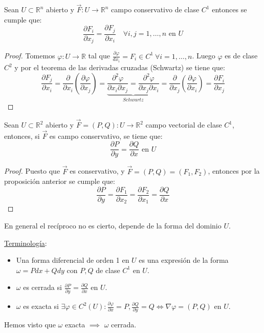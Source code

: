 \begin{proposición}
Sean $U \subset \mathbb{R}^n$ abierto y $\vec{F}: U \to \mathbb{R}^n$ campo conservativo de clase $C^1$ entonces se cumple que: 
$$\frac{\partial F_i}{\partial x_j} = \frac{\partial F_j}{\partial x_i} \quad \forall i,j = 1, \ldots, n \text{ en } U$$
\end{proposición}
\begin{proof}
    Tomemos $\varphi: U \to \mathbb{R}$ tal que $\frac{\partial\varphi}{dx_i} = F_i \in C^1 \ \forall i = 1, \ldots, n$. Luego $\varphi$ es de clase $C^2$ y por el teorema de las derivadas cruzadas (Schwartz) se tiene que:
    $$\frac{\partial F_j}{\partial x_i} = \frac{\partial}{\partial x_i}\left(\frac{\partial \varphi}{\partial x_j}\right) = \underbrace{\frac{\partial^2 \varphi}{\partial x_i \partial x_j} = \frac{\partial^2 \varphi}{\partial x_j \partial x_i}}_{Schwartz} = \frac{\partial}{\partial x_j}\left(\frac{\partial \varphi}{\partial x_i}\right) = \frac{\partial F_i}{\partial x_j}$$
\end{proof}
\begin{corolario}
    Sean $U \subset \mathbb{R}^2$ abierto y $\vec{F} = (P, Q): U \to \mathbb{R}^2$ campo vectorial de clase $C^1$, entonces, si $\vec{F}$ es campo conservativo, se tiene que:
    $$\frac{\partial P}{\partial y} = \frac{\partial Q}{\partial x} \text{ en } U$$
\end{corolario}
\begin{proof}
    Puesto que $\vec{F}$ es conservativo, y $\vec{F} = (P, Q) = (F_1, F_2)$, entonces por la proposición anterior se cumple que:
    $$\frac{\partial P}{\partial y} = \frac{\partial F_1}{\partial x_2} = \frac{\partial F_2}{\partial x_1} = \frac{\partial Q}{\partial x}$$ 
\end{proof}
\begin{observación}
En general el recíproco no es cierto, depende de la forma del dominio $U$.
\end{observación}
\begin{observación}
\underline{Terminología}:
\begin{itemize}
    \item Una forma diferencial de orden 1 en $U$ es una expresión de la forma $\omega =
              Pdx + Qdy$ con $P, Q$ de clase $C^1$ en $U$.
    \item $\omega$ es cerrada si $\frac{\partial P}{\partial y} = \frac{\partial Q}{\partial x}$ en $U$.
    \item $\omega$ es exacta si $\exists \varphi \in C^2(U) : \frac{\partial\varphi}{\partial x} = P, \frac{\partial Q}{\partial y} = Q \iff \nabla \varphi = (P, Q)$ en $U$.
\end{itemize}
Hemos visto que $\omega$ exacta $\implies$ $\omega$ cerrada.
\end{observación}


